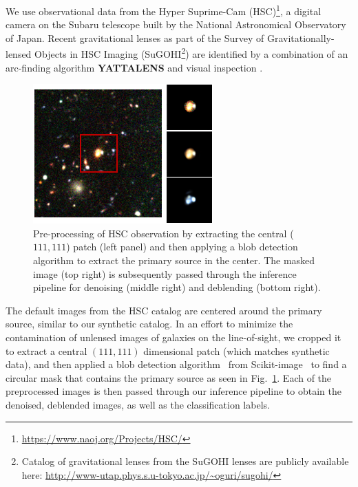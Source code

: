 \documentclass[12pt, twocolumn, apj]{openjournal}
\begin{document}
We use observational data from the Hyper Suprime-Cam (HSC)\footnote{\url{https://www.naoj.org/Projects/HSC/}}, a digital camera on the Subaru telescope built by the National Astronomical Observatory of Japan. Recent gravitational lenses as part of the Survey of Gravitationally-lensed Objects in HSC Imaging (SuGOHI\footnote{Catalog of gravitational lenses from the SuGOHI lenses are publicly available here: \url{http://www-utap.phys.s.u-tokyo.ac.jp/~oguri/sugohi/}}) are identified by a combination of an arc-finding algorithm \textbf{YATTALENS} and visual inspection \citep{hsc1_sonnenfeld}. 
\vspace{0.1in}
\begin{figure}[!tp]
\centering
\includegraphics[width=\linewidth]{Figures/HSC_process2.png}
\caption{Pre-processing of HSC observation by extracting the central ($111,111$) patch (left panel) and then applying a blob detection algorithm to extract the primary source in the center. The masked image (top right) is subsequently passed through the inference pipeline for denoising (middle right) and deblending (bottom right). }
\label{Fig:HSC_Process} 
\end{figure}
The default images from the HSC catalog are centered around the primary source, similar to our synthetic catalog. In an effort to minimize the contamination of unlensed images of galaxies on the line-of-sight, we cropped it to extract a central $(111,111)$ dimensional patch (which matches synthetic data), and then applied a blob detection algorithm~\cite{lowe2004distinctive} from Scikit-image~\cite{scikit-image} to find a circular mask that contains the primary source as seen in Fig.~\ref{Fig:HSC_Process}. Each of the preprocessed images is then passed through our inference pipeline to obtain the denoised, deblended images, as well as the classification labels. 
\end{document}
